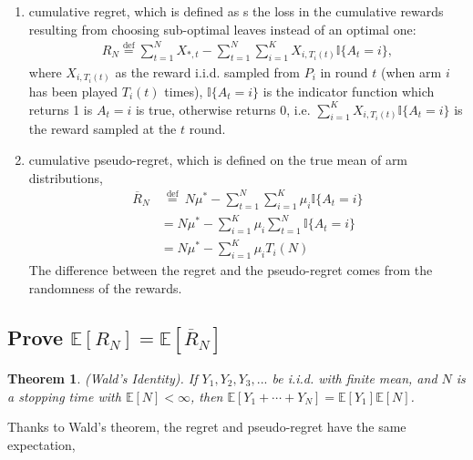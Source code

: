 \documentclass{article}
\newtheorem{theo}{Theorem}
\begin{document}
\begin{enumerate}
    \item cumulative regret, which is defined as s the loss in the cumulative rewards resulting from choosing sub-optimal leaves instead of an optimal one:
    \begin{align}
        \label{equ: regret}
        R_{N} \stackrel{\operatorname{def}}{=} \sum_{t=1}^{N} X_{\ast, t}-\sum_{t=1}^{N} \sum_{i = 1}^{K} X_{i, T_i(t)} \mathbb{I}\{A_t = i\},
    \end{align}
    where $X_{i,T_i(t)}$ as the reward i.i.d. sampled from $P_i$ in round $t$ (when arm $i$ has been played $T_i(t)$ times),  $\mathbb{I}\{A_t = i\}$ is the indicator function which returns 1 is $A_t = i$ is true, otherwise returns 0, i.e.  $\sum_{i = 1}^{K} X_{i, T_i(t)} \mathbb{I}\{A_t = i\}$ is the reward sampled at the $t$ round.  
    \item cumulative pseudo-regret, which is defined on the true mean of arm distributions, 
    \begin{align}
        \label{equ: pseudo regret}
        \overline{R}_{N} & \stackrel{\text { def }}{=}
        N \mu^{*}-\sum_{t=1}^{N} \sum_{i = 1}^{K} \mu_i \mathbb{I}\{A_t = i\}\\
        &= N \mu^{*}-\sum_{i = 1}^{K} \mu_i \sum_{t=1}^{N}   \mathbb{I}\{A_t = i\}\\
        \label{equ: pseudo regret simplified}
        &= N \mu^{*}-\sum_{i = 1}^{K} \mu_i T_i(N)
    \end{align}
    The difference between the regret and the pseudo-regret comes from the randomness of the rewards.
\end{enumerate}

\subsection{Prove $\mathbb{E}[R_N] = \mathbb{E}[\overline{R}_{N}]$}

\begin{theo} (Wald’s Identity). If $Y_1, Y_2, Y_3, ...$ be i.i.d. with finite mean, and $N$ is a stopping time with $\mathbb{E}[N] < \infty$, then $\mathbb{E}\left[Y_{1}+\cdots+Y_{N}\right]=\mathbb{E}\left[Y_{1}\right] \mathbb{E}[N]$.
\end{theo}

Thanks to Wald's theorem, the regret and pseudo-regret have the same expectation, 
\end{document}
